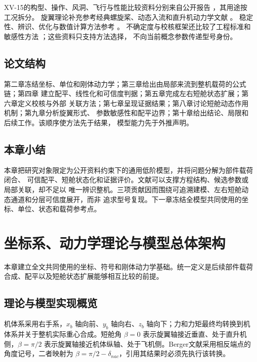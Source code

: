 \documentclass[UTF8,12pt,oneside,openany,fontset=windows]{ctexbook}
\begin{document}
XV-15的构型、操作、风洞、飞行与性能比较资料分别来自公开报告 \cite{nasa62407,dugan1980,nasa100025,nasa81177,nasa166537}，其用途按工况拆分。 旋翼理论补充参考经典螺旋桨、动态入流和直升机动力学文献 \cite{dreier2007,bramwell2001,pitt1981,peters1995,glauert1935,mccormick1995}。 稳定性、辨识、优化与数值计算方法参考 \cite{nelson1998,anderson1999,drela2014,tischler2012,jategaonkar2015,klein2006,golub2013,kelley1999,press2007}。 不确定度与校核框架还比较了工程标准和敏感性方法 \cite{asmevv20,jcgm100,saltelli2008,coleman2009,aiaag077}；这些资料只支持方法选择， 不向当前概念参数传递型号身份。

\section{论文结构}

第二章冻结坐标、单位和刚体动力学；第三章给出由局部来流到整机载荷的公式链；第四章 建立配平、线性化和可信度判据；第五章完成左右短舱状态扩展；第六章定义校核与外部 关联方法；第七章呈现证据结果；第八章讨论短舱动态作用机制；第九章分析旋翼形式、 参数敏感性和配平边界；第十章给出结论、局限和后续工作。该顺序使方法先于结果， 模型能力先于外推声明。

\section{本章小结}

本章把研究对象限定为公开资料约束下的通用低阶模型，并将问题分解为部件载荷闭合、 可信配平、短舱状态化和证据评价。文献可以支撑方程结构、候选参数或局部关联，却不足以 唯一辨识整机。三项贡献因而围绕可追溯建模、左右短舱动态通道和分层可信度展开，而非 追求型号复现。下一章冻结全模型共同使用的坐标、单位、状态和载荷参考点。

\chapter{坐标系、动力学理论与模型总体架构}

本章建立全文共同使用的坐标、符号和刚体动力学基础。统一定义是后续部件载荷合成、配平以及短舱状态扩展能够相互比较的前提。

\section{理论与模型实现概览}

机体系采用右手系，$x_b$ 轴向前、$y_b$ 轴向右、$z_b$ 轴向下；力和力矩最终均转换到机体系并关于整机实际重心合成。短舱角 $\beta=0$ 表示旋翼轴接近垂直、处于直升机侧，$\beta=\pi/2$ 表示旋翼轴接近机体纵轴、处于飞机侧。Berger文献采用相反端点的角度记号，二者映射为 $\beta=\pi/2-\delta_{nac}$，引用其结果时必须先执行该转换。
\end{document}
